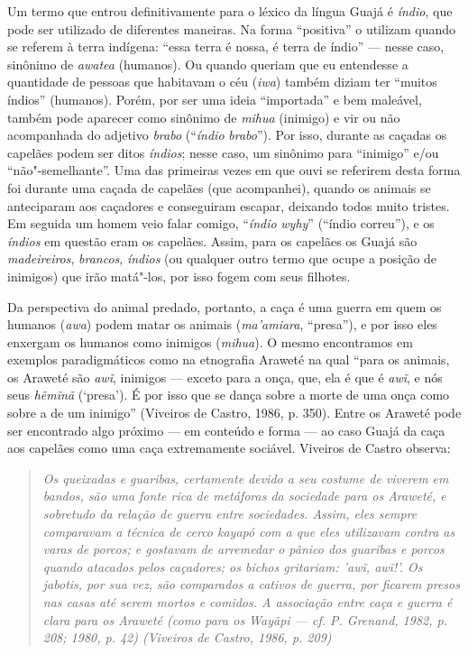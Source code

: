 Um termo que entrou definitivamente para o léxico da língua Guajá é
\emph{índio}, que pode ser utilizado de diferentes maneiras. Na forma
``positiva'' o utilizam quando se referem à terra indígena: ``essa terra é
nossa, é terra de índio'' --- nesse caso, sinônimo de \emph{awatea}
(humanos). Ou quando queriam que eu entendesse a quantidade de pessoas
que habitavam o céu (\emph{iwa}) também diziam ter ``muitos índios''
(humanos). Porém, por ser uma ideia ``importada'' e bem maleável, também
pode aparecer como sinônimo de \emph{mihua} (inimigo) e vir ou não
acompanhada do adjetivo \emph{brabo} (``\emph{índio} \emph{brabo}''). Por
isso, durante as caçadas os capelães podem ser ditos \emph{índios};
nesse caso, um sinônimo para ``inimigo'' e/ou ``não"-semelhante''. Uma das
primeiras vezes em que ouvi se referirem desta forma foi durante uma
caçada de capelães (que acompanhei), quando os animais se anteciparam
aos caçadores e conseguiram escapar, deixando todos muito tristes. Em
seguida um homem veio falar comigo, ``\emph{índio} \emph{wyhy}'' (``índio
correu''), e os \emph{índios} em questão eram os capelães. Assim, para os
capelães os Guajá são \emph{madeireiros}, \emph{brancos}, \emph{índios}
(ou qualquer outro termo que ocupe a posição de inimigos) que irão
matá"-los, por isso fogem com seus filhotes.

Da perspectiva do animal predado, portanto, a caça é uma guerra em quem
os humanos (\emph{awa}) podem matar os animais (\emph{ma'amiara},
``presa''), e por isso eles enxergam os humanos como inimigos
(\emph{mihua}). O mesmo encontramos em exemplos paradigmáticos como na
etnografia Araweté na qual ``para os animais, os Araweté são \emph{awĩ},
inimigos --- exceto para a onça, que, ela é que é \emph{awĩ}, e nós seus
\emph{hẽmĩnã} (`presa'). É por isso que se dança sobre a morte de uma
onça como sobre a de um inimigo'' (Viveiros de Castro, 1986, p. 350).
Entre os Araweté pode ser encontrado algo próximo --- em conteúdo e forma
--- ao caso Guajá da caça aos capelães como uma caça extremamente
sociável. Viveiros de Castro observa:

\begin{quote}
\emph{Os queixadas e guaribas, certamente devido a seu costume de viverem em
bandos, são uma fonte rica de metáforas da sociedade para os Araweté, e
sobretudo da relação de guerra entre sociedades. Assim, eles sempre
comparavam a técnica de cerco kayapó com a que eles utilizavam contra as
varas de porcos; e gostavam de arremedar o pânico dos guaribas e porcos
quando atacados pelos caçadores; os bichos gritariam: '\emph{awĩ},
\emph{awĩ}!'. Os jabotis, por sua vez, são comparados a cativos de
guerra, por ficarem presos nas casas até serem mortos e comidos. A
associação entre caça e guerra é clara para os Araweté (como para os
Wayãpi --- \emph{cf}. P. Grenand, 1982, p. 208; 1980, p. 42) (Viveiros de Castro,
1986, p. 209)}
\end{quote}

